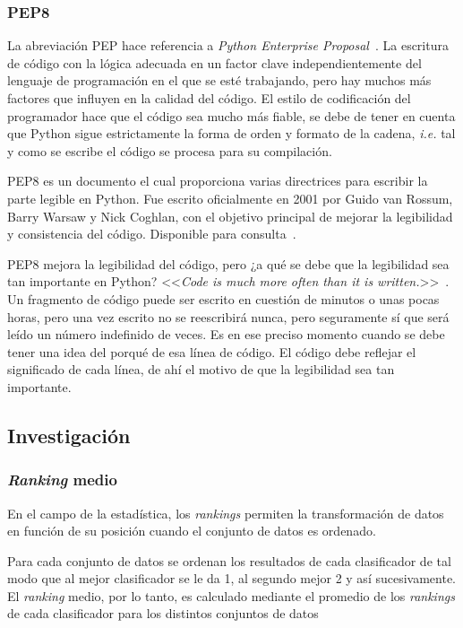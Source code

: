 \subsubsection{PEP8}
La abreviación PEP hace referencia a \textit{Python Enterprise Proposal}~\cite{pep8javatpoint}. La escritura de código con la lógica adecuada en un factor clave independientemente del lenguaje de programación en el que se esté trabajando, pero hay muchos más factores que influyen en la calidad del código. El estilo de codificación del programador hace que el código sea mucho más fiable, se debe de tener en cuenta que Python sigue estrictamente la forma de orden y formato de la cadena, \textit{i.e.} tal y como se escribe el código se procesa para su compilación.

PEP8 es un documento el cual proporciona varias directrices para escribir la parte legible en Python. Fue escrito oficialmente en 2001 por Guido van Rossum, Barry Warsaw y Nick Coghlan, con el objetivo principal de mejorar la legibilidad y consistencia del código. Disponible para consulta~\cite{rossum_warsaw_coghlan}.

PEP8 mejora la legibilidad del código, pero ¿a qué se debe que la legibilidad sea tan importante en Python? <<\textit{Code is much more often than it is written.}>>~\cite{guidophrase}. Un fragmento de código puede ser escrito en cuestión de minutos o unas pocas horas, pero una vez escrito no se reescribirá nunca, pero seguramente sí que será leído un número indefinido de veces. Es en ese preciso momento cuando se debe tener una idea del porqué de esa línea de código. El código debe reflejar el significado de cada línea, de ahí el motivo de que la legibilidad sea tan importante.

\subsection{Investigación}
\subsubsection{\textit{Ranking} medio}
En el campo de la estadística, los \textit{rankings} permiten la transformación de datos en función de su posición cuando el conjunto de datos es ordenado.

Para cada conjunto de datos se ordenan los resultados de cada clasificador de tal modo que al mejor clasificador se le da 1, al segundo mejor 2 y así sucesivamente. El \textit{ranking} medio, por lo tanto, es calculado mediante el promedio de los \textit{rankings} de cada clasificador para los distintos conjuntos de datos

